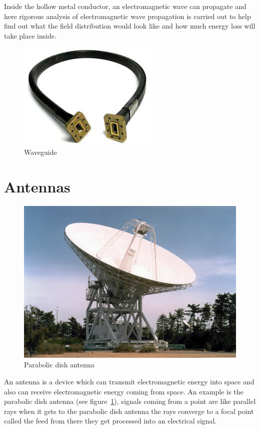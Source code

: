 Inside the hollow metal conductor, an electromagnetic wave can propagate and here rigorous analysis of electromagnetic wave propagation is carried out to help find out what the field distribution would look like and how much energy loss will take place inside.
\begin{figure}[h]
\centering
\includegraphics[scale=0.4]{./graphics/waveguide2}
\caption{Waveguide}
\end{figure}

\section{Antennas}
\begin{figure}[h]
\centering
\includegraphics[scale=0.4]{./graphics/spcaceantenna}
\caption{Parabolic dish antenna}
\label{fig:spaceantenna}
\end{figure}

An antenna is a device which can transmit electromagnetic energy into space and also can receive electromagnetic energy coming from space. An example is the parabolic dish antenna (see figure~\ref{fig:spaceantenna}), signals coming from a point are like parallel rays when it gets to the parabolic dish antenna the rays converge to a focal point called the feed from there they get processed into an electrical signal.

